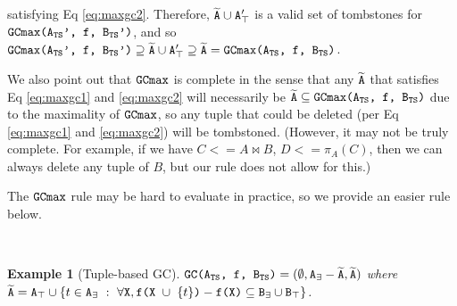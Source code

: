 \documentclass[10pt]{proc}
\numberwithin{equation}{section}
\newtheorem{example}{Example}[section]
\renewcommand{\tt}[1]{\ifmmode\text{\texttt{#1}}\else\texttt{#1}\fi}
\begin{document}
satisfying Eq \eqref{eq:maxgc2}.
Therefore, $\widetilde{\tt{A}} \cup \tt{A}_\top'$ is a valid set of tombstones for $\tt{GCmax(A$_\text{TS}$', f, B$_\text{TS}$')}$, and so $\tt{GCmax(A$_\text{TS}$', f, B$_\text{TS}$')} \supseteq \widetilde{\tt{A}} \cup \tt{A}_\top' \supseteq \widetilde{\tt{A}} = \tt{GCmax(A$_\text{TS}$, f, B$_\text{TS}$)}$.

We also point out that $\tt{GCmax}$ is complete in the sense that any $\widetilde{\tt{A}}$ that satisfies Eq \eqref{eq:maxgc1} and \eqref{eq:maxgc2} will necessarily be $\widetilde{\tt{A}} \subseteq \tt{GCmax(A$_\text{TS}$, f, B$_\text{TS}$)}$ due to the maximality of $\tt{GCmax}$, so any tuple that could be deleted (per Eq \eqref{eq:maxgc1} and \eqref{eq:maxgc2}) will be tombstoned.
(However, it may not be truly complete. For example, if we have $C <= A \Join B$, $D <= \pi_A(C)$, then we can always delete any tuple of $B$, but our rule does not allow for this.)

The $\tt{GCmax}$ rule may be hard to evaluate in practice, so we provide an easier rule below.

~

\begin{example}[Tuple-based GC]
$\tt{GC(A$_\text{TS}$, f, B$_\text{TS}$)} = (\emptyset, \tt{A}_\exists - \widetilde{\tt{A}}, \widetilde{\tt{A}})$ where $\widetilde{\tt{A}} = \tt{A}_\top \cup \{t \in \tt{A}_\exists ~:~ \forall \tt{X}, \tt{f(X $\cup$ $\{t\}$)} - \tt{f(X)} \subseteq \tt{B}_\exists \cup \tt{B}_\top\}$.
\end{example}
\end{document}
